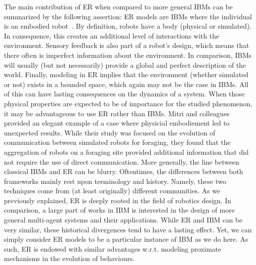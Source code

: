 


        The main contribution of ER when compared to more general IBMs can be summarized by the following assertion: ER models are IBMs where the individual is an embodied robot~\parencite{Mitri2012}. By definition, robots have a body (physical or simulated). In consequence, this creates an additional level of interactions with the environment. Sensory feedback is also part of a robot's design, which means that there often is imperfect information about the environment. In comparison, IBMs will usually (but not necessarily) provide a global and perfect description of the world. Finally, modeling in ER implies that the environment (whether simulated or not) exists in a bounded space, which again may not be the case in IBMs. All of this can have lasting consequences on the dynamics of a system. When those physical properties are expected to be of importance for the studied phenomenon, it may be advantageous to use ER rather than IBMs. Mitri and colleagues~\parencite{Mitri2009} provided an elegant example of a case where physicial embodiement led to unexpected results. While their study was focused on the evolution of communication between simulated robots for foraging, they found that the aggregation of robots on a foraging site provided additional information that did not require the use of direct communication. More generally, the line between classical IBMs and ER can be blurry. Oftentimes, the differences between both frameworks mainly rest upon terminology and history. Namely, these two techniques come from (at least originally) different communities. As we previously explained, ER is deeply rooted in the field of robotics design. In comparison, a large part of works in IBM is interested in the design of more general multi-agent systems and their applications. While ER and IBM can be very similar, these historical divergences tend to have a lasting effect. Yet, we can simply consider ER models to be a particular instance of IBM as we do here. As such, ER is endowed with similar advantages w.r.t. modeling proximate mechanisms in the evolution of behaviours.

